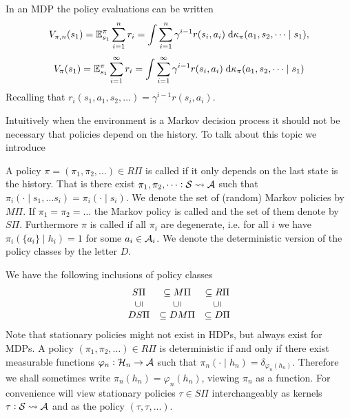 \begin{rem}
  In an MDP the policy evaluations can be written
  \[ V_{\pi, n}(s_1)
    = \mathbb{E}^\pi_{s_1} \sum_{i=1}^n r_i
    = \int \sum_{i=1}^n \gamma^{i-1} r(s_i, a_i)
    \; \mathrm{d} \kappa_\pi (a_1, s_2, \dots \mid s_1),
  \]
  \[ V_\pi(s_1)
    = \mathbb{E}^\pi_{s_1} \sum_{i=1}^\infty r_i
    = \int \sum_{i=1}^\infty \gamma^{i-1} r(s_i, a_i)
    \; \mathrm{d} \kappa_\pi (a_1, s_2, \dots \mid s_1)
  \]
  Recalling that $r_i(s_1, a_1, s_2, \dots) = \gamma^{i-1} r(s_i, a_i)$.
\end{rem}

Intuitively when the environment is a Markov decision process
it should not be necessary that policies depend on the history.
To talk about this topic we introduce

\begin{defn}
  A policy $\pi = (\pi_1, \pi_2, \dots) \in R\Pi$
  is called  if it
  only depends on the last state is the history.
  That is there exist $\pi_1, \pi_2, \dots : \mathcal{S} \leadsto \mathcal{A}$
  such that $\pi_i(\cdot \mid s_1, \dots s_i) = \pi_i(\cdot \mid s_i)$.
  We denote the set of (random) Markov policies by $M\Pi$.
  If $\pi_1 = \pi_2 = \dots$ the Markov policy is called
  and the set of them denote by $S\Pi$.
  Furthermore $\pi$ is called  if all $\pi_i$
  are degenerate, i.e. for all $i$ we have
  $\pi_i(\{a_i\} \mid h_i) = 1$ for some $a_i \in \mathcal{A}_{i}$.
  We denote the deterministic version of the policy classes
  by the letter $D$.
\end{defn}

\begin{rem} 
  We have the following inclusions of policy classes
  \[ \begin{matrix}
      S\Pi &\subseteq M\Pi &\subseteq R\Pi
      \\ \rleft{\subseteq} & \rleft{\subseteq} & \rleft{\subseteq} 
      \\ DS\Pi &\subseteq DM\Pi &\subseteq D\Pi
  \end{matrix} \] 
  Note that stationary policies might not exist
  in HDPs, but always exist for MDPs.
  A policy $(\pi_1, \pi_2, \dots) \in R\Pi$ is deterministic
  if and only if there exist measurable
  functions $\varphi_n : \mathcal{H}_n \to \mathcal{A}$ such that
  $\pi_n(\cdot \mid h_n) = \delta_{\varphi_n(h_n)}$. Therefore we shall sometimes
  write $\pi_n(h_n) = \varphi_n(h_n)$, viewing $\pi_n$ as a function.
  For convenience
  will view stationary policies $\tau \in S\Pi$ interchangeably as kernels
  $\tau : \mathcal{S} \leadsto \mathcal{A}$ and as the policy
  $(\tau, \tau, \dots)$.
\end{rem}

